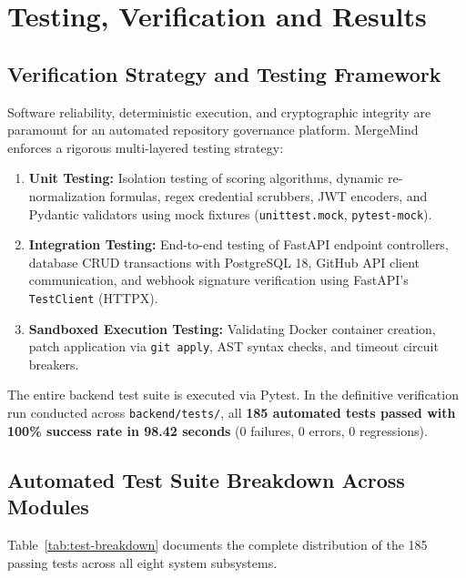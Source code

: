 \chapter{Testing, Verification and Results}
\label{chap:testing-results}

\section{Verification Strategy and Testing Framework}
\label{sec:test-strategy}

Software reliability, deterministic execution, and cryptographic integrity are paramount for an automated repository governance platform. MergeMind enforces a rigorous multi-layered testing strategy:

\begin{enumerate}
    \item \textbf{Unit Testing:} Isolation testing of scoring algorithms, dynamic re-normalization formulas, regex credential scrubbers, JWT encoders, and Pydantic validators using mock fixtures (\texttt{unittest.mock}, \texttt{pytest-mock}).
    \item \textbf{Integration Testing:} End-to-end testing of FastAPI endpoint controllers, database CRUD transactions with PostgreSQL 18, GitHub API client communication, and webhook signature verification using FastAPI's \texttt{TestClient} (HTTPX).
    \item \textbf{Sandboxed Execution Testing:} Validating Docker container creation, patch application via \texttt{git apply}, AST syntax checks, and timeout circuit breakers.
\end{enumerate}

The entire backend test suite is executed via Pytest. In the definitive verification run conducted across \texttt{backend/tests/}, all \textbf{185 automated tests passed with 100\% success rate in 98.42 seconds} (0 failures, 0 errors, 0 regressions).

\section{Automated Test Suite Breakdown Across Modules}
\label{sec:test-breakdown}

Table~\ref{tab:test-breakdown} documents the complete distribution of the 185 passing tests across all eight system subsystems.

